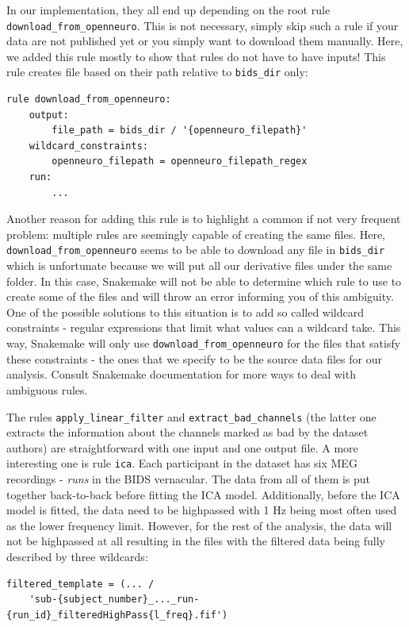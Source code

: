 \documentclass[a4paper,man,floatsintext,natbib]{apa6}
\begin{document}
In our implementation, they all end up depending on the root rule \verb|download_from_openneuro|. This is not necessary, simply skip such a rule if your data are not published yet or you simply want to download them manually. Here, we added this rule mostly to show that rules do not have to have inputs! This rule creates file based on their path relative to \verb|bids_dir| only:
\begin{verbatim}
rule download_from_openneuro:
    output:
        file_path = bids_dir / '{openneuro_filepath}'
    wildcard_constraints:
        openneuro_filepath = openneuro_filepath_regex
    run:
        ...
\end{verbatim}

Another reason for adding this rule is to highlight a common if not very frequent problem: multiple rules are seemingly capable of creating the same files. Here, \verb|download_from_openneuro| seems to be able to download any file in \verb|bids_dir| which is unfortunate because we will put all our derivative files under the same folder. In this case, Snakemake will not be able to determine which rule to use to create some of the files and will throw an error informing you of this ambiguity. One of the possible solutions to this situation is to add so called wildcard constraints - regular expressions that limit what values can a wildcard take. This way, Snakemake will only use \verb|download_from_openneuro| for the files that satisfy these constraints - the ones that we specify to be the source data files for our analysis. Consult Snakemake documentation for more ways to deal with ambiguous rules.

The rules \verb|apply_linear_filter| and \verb|extract_bad_channels| (the latter one extracts the information about the channels marked as bad by the dataset authors) are straightforward with one input and one output file. A more interesting one is rule \verb|ica|. Each participant in the dataset has six MEG recordings - \emph{runs} in the BIDS vernacular. The data from all of them is put together back-to-back before fitting the ICA model. Additionally, before the ICA model is fitted, the data need to be highpassed with 1 Hz being most often used as the lower frequency limit. However, for the rest of the analysis, the data will not be highpassed at all resulting in the files with the filtered data being fully described by three wildcards:

\begin{lstlisting}[breaklines]
filtered_template = (... /
    'sub-{subject_number}_..._run-{run_id}_filteredHighPass{l_freq}.fif')
\end{lstlisting}
\end{document}
